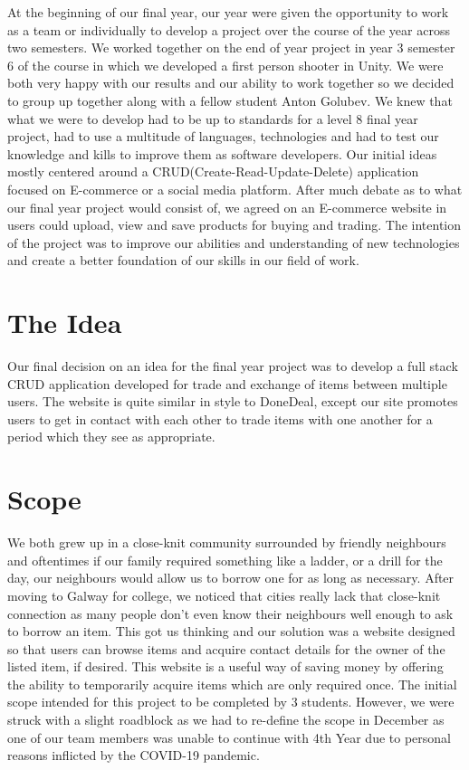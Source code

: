 At the beginning of our final year, our year were given the opportunity to work as a team or individually to develop a project over the course of the year across two semesters. We worked together on the end of year project in year 3 semester 6 of the course in which we developed a first person shooter in Unity. We were both very happy with our results and our ability to work together so we decided to group up together along with a fellow student Anton Golubev. We knew that what we were to develop had to be up to standards for a level 8 final year project, had to use a multitude of languages, technologies and had to test our knowledge and kills to improve them as software developers. Our initial ideas mostly centered around a CRUD(Create-Read-Update-Delete) application focused on E-commerce or a social media platform. After much debate as to what our final year project would consist of, we agreed on an E-commerce website in users could upload, view and save products for buying and trading. The intention of the project was to improve our abilities and understanding of new technologies and create a better foundation of our skills in our field of work.

\section{The Idea}
Our final decision on an idea for the final year project was to develop a full stack CRUD application developed for trade and exchange of items between multiple users. The website is quite similar in style to DoneDeal, except our site promotes users to get in contact with each other to trade items with one another for a period which they see as appropriate.

\section{Scope}
We both grew up in a close-knit community surrounded by friendly neighbours and oftentimes if our family required something like a ladder, or a drill for the day, our neighbours would allow us to borrow one for as long as necessary. After moving to Galway for college, we noticed that cities really lack that close-knit connection as many people don't even know their neighbours well enough to ask to borrow an item. This got us thinking and our solution was a website designed so that users can browse items and acquire contact details for the owner of the listed item, if desired. This website is a useful way of saving money by offering the ability to temporarily acquire items which are only required once. \newline
The initial scope intended for this project to be completed by 3 students. However, we were struck with a slight roadblock as we had to re-define the scope in December as one of our team members was unable to continue with 4th Year due to personal reasons inflicted by the COVID-19 pandemic.

